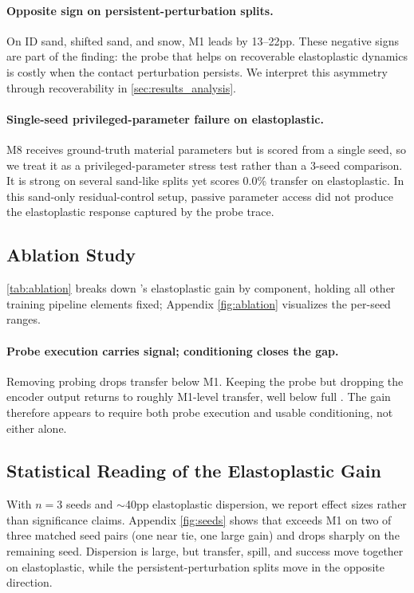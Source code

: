 \paragraph{Opposite sign on persistent-perturbation splits.}
On ID sand, shifted sand, and snow, M1 leads by 13--22pp. These negative signs are part of the finding: the probe that helps on recoverable elastoplastic dynamics is costly when the contact perturbation persists. We interpret this asymmetry through recoverability in \cref{sec:results_analysis}.

\paragraph{Single-seed privileged-parameter failure on elastoplastic.}
M8 receives ground-truth material parameters but is scored from a single seed, so we treat it as a privileged-parameter stress test rather than a 3-seed comparison. It is strong on several sand-like splits yet scores 0.0\% transfer on elastoplastic. In this sand-only residual-control setup, passive parameter access did not produce the elastoplastic response captured by the probe trace.



\subsection{Ablation Study}
\label{sec:results_ablation}

\cref{tab:ablation} breaks down \PTA{}'s elastoplastic gain by component, holding all other training pipeline elements fixed; Appendix \cref{fig:ablation} visualizes the per-seed ranges.

\paragraph{Probe execution carries signal; conditioning closes the gap.}
Removing probing drops transfer below M1. Keeping the probe but dropping the encoder output returns to roughly M1-level transfer, well below full \PTA{}. The gain therefore appears to require both probe execution and usable conditioning, not either alone.

\subsection{Statistical Reading of the Elastoplastic Gain}
\label{sec:results_stats}

With $n=3$ seeds and $\sim$40pp elastoplastic dispersion, we report effect sizes rather than significance claims. Appendix \cref{fig:seeds} shows that \PTA{} exceeds M1 on two of three matched seed pairs (one near tie, one large gain) and drops sharply on the remaining seed. Dispersion is large, but transfer, spill, and success move together on elastoplastic, while the persistent-perturbation splits move in the opposite direction.

